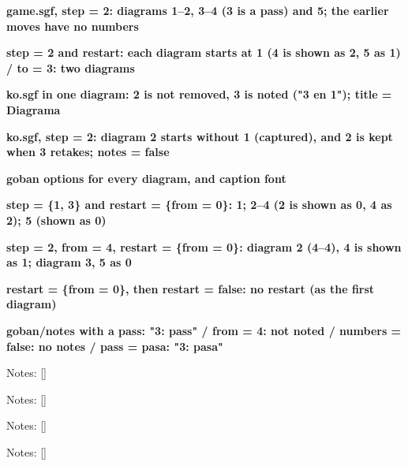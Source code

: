 \documentclass{article}
\newcommand\case[1]{\par\medskip\noindent\textbf{#1}\par\nopagebreak}
\begin{document}

\case{game.sgf, step = 2: diagrams 1--2, 3--4 (3 is a pass) and 5; the earlier moves have no numbers}

\case{step = 2 and restart: each diagram starts at 1 (4 is shown as 2, 5 as 1) / to = 3: two diagrams}


\case{ko.sgf in one diagram: 2 is not removed, 3 is noted ("3 en 1"); title = Diagrama}
\begingroup
{}
\endgroup

\case{ko.sgf, step = 2: diagram 2 starts without 1 (captured), and 2 is kept when 3 retakes; notes = false}

\case{goban options for every diagram, and caption font}

\case{step = \{1, 3\} and restart = \{from = 0\}: 1; 2--4 (2 is shown as 0, 4 as 2); 5 (shown as 0)}

\case{step = 2, from = 4, restart = \{from = 0\}: diagram 2 (4--4), 4 is shown as 1; diagram 3, 5 as 0}

\case{restart = \{from = 0\}, then restart = false: no restart (as the first diagram)}

\newcommand\notes[1][]{\par\noindent Notes: [\pgfgomovenotes[#1]]\par}
\case{goban/notes with a pass: "3: pass" / from = 4: not noted / numbers = false: no notes / pass = pasa: "3: pasa"}
\begin{goban}[9, notes]\end{goban}
\notes
\begin{goban}[9, notes]\end{goban}
\notes
\begin{goban}[9, notes]\end{goban}
\notes
\begin{goban}[9, notes]\end{goban}
\notes[pass = pasa]
\end{document}
